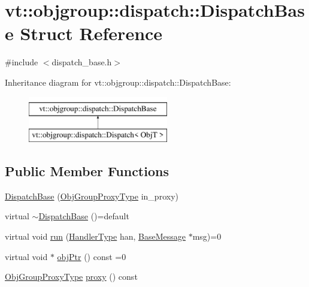 \hypertarget{structvt_1_1objgroup_1_1dispatch_1_1_dispatch_base}{}\section{vt\+:\+:objgroup\+:\+:dispatch\+:\+:Dispatch\+Base Struct Reference}
\label{structvt_1_1objgroup_1_1dispatch_1_1_dispatch_base}


{\ttfamily \#include $<$dispatch\+\_\+base.\+h$>$}

Inheritance diagram for vt\+:\+:objgroup\+:\+:dispatch\+:\+:Dispatch\+Base\+:\begin{figure}[H]
\begin{center}
\leavevmode
\includegraphics[height=2.000000cm]{structvt_1_1objgroup_1_1dispatch_1_1_dispatch_base}
\end{center}
\end{figure}
\subsection*{Public Member Functions}
\begin{DoxyCompactItemize}
\item 
\hyperlink{structvt_1_1objgroup_1_1dispatch_1_1_dispatch_base_ac6d83a669d4b1a30fbdc264de4d5bcb4}{Dispatch\+Base} (\hyperlink{namespacevt_ad7cae989df485fccca57f0792a880a8e}{Obj\+Group\+Proxy\+Type} in\+\_\+proxy)
\item 
virtual \hyperlink{structvt_1_1objgroup_1_1dispatch_1_1_dispatch_base_ad3a30bcc1ed4d045c208818d10b6cf96}{$\sim$\+Dispatch\+Base} ()=default
\item 
virtual void \hyperlink{structvt_1_1objgroup_1_1dispatch_1_1_dispatch_base_a539a57642138f35e38419e57e9138a2f}{run} (\hyperlink{namespacevt_af64846b57dfcaf104da3ef6967917573}{Handler\+Type} han, \hyperlink{namespacevt_ac34f95a5e2b8109b55bfba52b074443d}{Base\+Message} $\ast$msg)=0
\item 
virtual void $\ast$ \hyperlink{structvt_1_1objgroup_1_1dispatch_1_1_dispatch_base_ad0ba1baf3de179f6d6b749aedcd76490}{obj\+Ptr} () const =0
\item 
\hyperlink{namespacevt_ad7cae989df485fccca57f0792a880a8e}{Obj\+Group\+Proxy\+Type} \hyperlink{structvt_1_1objgroup_1_1dispatch_1_1_dispatch_base_a2ab9479966f207847a271999a510f53d}{proxy} () const
\end{DoxyCompactItemize}


